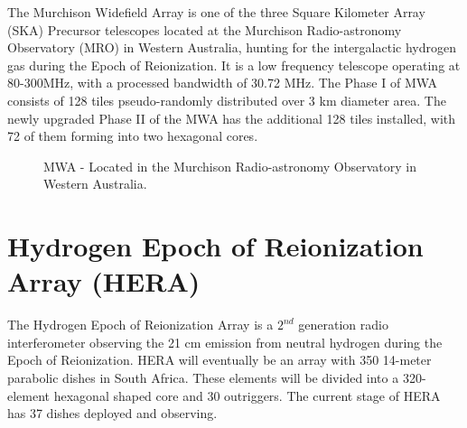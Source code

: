 \documentclass[a0,landscape]{a0poster}
\begin{document}
\begin{multicols}{4}
The Murchison Widefield Array is one of the three Square Kilometer Array (SKA) Precursor telescopes located at the Murchison Radio-astronomy Observatory (MRO) in Western Australia, hunting for the intergalactic hydrogen gas during the Epoch of Reionization. It is a low frequency telescope operating at 80-300MHz, with a processed bandwidth of 30.72 MHz. The Phase I of MWA consists of 128 tiles pseudo-randomly distributed over 3 km diameter area. The newly upgraded Phase II of the MWA has the additional 128 tiles installed, with 72 of them forming into two hexagonal cores. 
\begin{figure}[H]
\centering
\label{fig:HERA}
\caption{MWA - Located in the Murchison Radio-astronomy Observatory in Western Australia.}
\end{figure}


\section*{Hydrogen Epoch of Reionization Array (HERA)}

The Hydrogen Epoch of Reionization Array is a $2^{nd}$ generation radio interferometer observing the 21 cm emission from neutral hydrogen during the Epoch of Reionization. HERA will eventually be an array with 350 14-meter parabolic dishes in South Africa. These elements will be divided into a 320-element hexagonal shaped core and 30 outriggers. The current stage of HERA has 37 dishes deployed and observing. 


\end{multicols}
\end{document}
